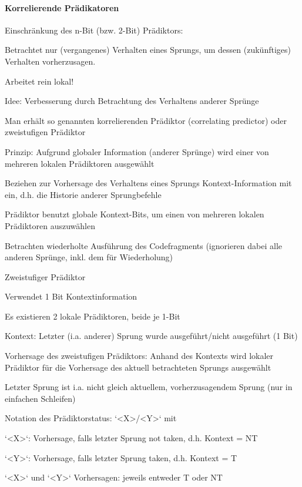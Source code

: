 \documentclass[10pt,landscape]{article}
\begin{document}
\begin{multicols}{3}
  \paragraph{ Korrelierende Prädikatoren}
  \begin{itemize*}
    \item Einschränkung des n-Bit (bzw. 2-Bit) Prädiktors:
    \item Betrachtet nur (vergangenes) Verhalten eines Sprungs, um dessen (zukünftiges) Verhalten vorherzusagen.
    \item Arbeitet rein lokal!
    \item Idee: Verbesserung durch Betrachtung des Verhaltens anderer Sprünge
    \item Man erhält so genannten korrelierenden Prädiktor (correlating predictor) oder zweistufigen Prädiktor
    \item Prinzip: Aufgrund globaler Information (anderer Sprünge) wird einer von mehreren lokalen Prädiktoren ausgewählt
    \item Beziehen zur Vorhersage des Verhaltens eines Sprungs Kontext-Information mit ein, d.h. die Historie anderer Sprungbefehle
    \item Prädiktor benutzt globale Kontext-Bits, um einen von mehreren lokalen Prädiktoren auszuwählen
    \item Betrachten wiederholte Ausführung des Codefragments (ignorieren dabei alle anderen Sprünge, inkl. dem für Wiederholung)
  \end{itemize*}
  
  Zweistufiger Prädiktor
  \begin{itemize*}
    \item Verwendet 1 Bit Kontextinformation
    \item Es existieren 2 lokale Prädiktoren, beide je 1-Bit
    \item Kontext: Letzter (i.a. anderer) Sprung wurde ausgeführt/nicht ausgeführt (1 Bit)
    \item Vorhersage des zweistufigen Prädiktors: Anhand des Kontexts wird lokaler Prädiktor für die Vorhersage des aktuell betrachteten Sprungs ausgewählt
    \item Letzter Sprung ist i.a. nicht gleich aktuellem, vorherzusagendem Sprung (nur in einfachen Schleifen)
    \item Notation des Prädiktorstatus: `<X>/<Y>` mit
    \item `<X>`: Vorhersage, falls letzter Sprung not taken, d.h. Kontext = NT
    \item `<Y>`: Vorhersage, falls letzter Sprung taken, d.h. Kontext = T
    \item `<X>` und `<Y>` Vorhersagen: jeweils entweder T oder NT
  \end{itemize*}
  

\end{multicols}
\end{document}
